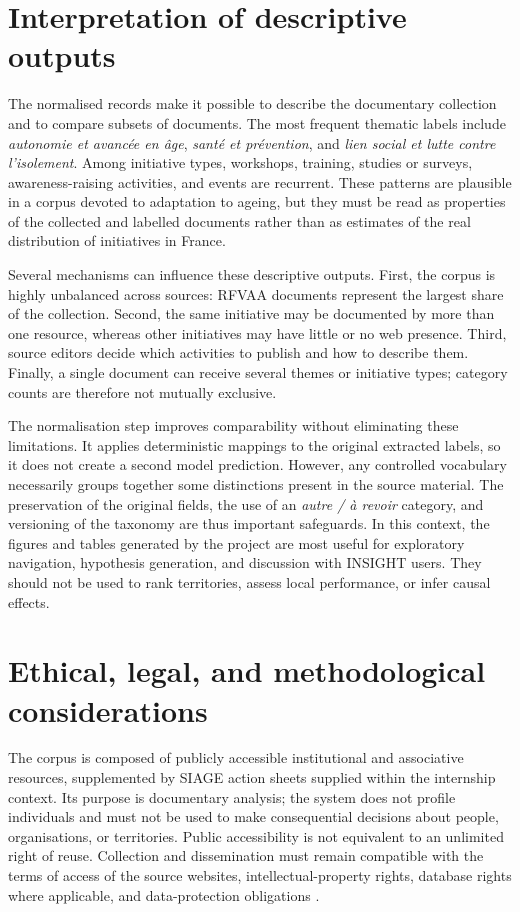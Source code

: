 \section{Interpretation of descriptive outputs}

The normalised records make it possible to describe the documentary collection
and to compare subsets of documents. The most frequent thematic labels include
\textit{autonomie et avanc\'ee en \^age}, \textit{sant\'e et pr\'evention}, and
\textit{lien social et lutte contre l'isolement}. Among initiative types,
workshops, training, studies or surveys, awareness-raising activities, and
events are recurrent. These patterns are plausible in a corpus devoted to
adaptation to ageing, but they must be read as properties of the collected and
labelled documents rather than as estimates of the real distribution of
initiatives in France.

Several mechanisms can influence these descriptive outputs. First, the corpus
is highly unbalanced across sources: RFVAA documents represent the largest
share of the collection. Second, the same initiative may be documented by more
than one resource, whereas other initiatives may have little or no web
presence. Third, source editors decide which activities to publish and how to
describe them. Finally, a single document can receive several themes or
initiative types; category counts are therefore not mutually exclusive.

The normalisation step improves comparability without eliminating these
limitations. It applies deterministic mappings to the original extracted
labels, so it does not create a second model prediction. However, any
controlled vocabulary necessarily groups together some distinctions present in
the source material. The preservation of the original fields, the use of an
\textit{autre / \`a revoir} category, and versioning of the taxonomy are thus
important safeguards. In this context, the figures and tables generated by the
project are most useful for exploratory navigation, hypothesis generation, and
discussion with INSIGHT users. They should not be used to rank territories,
assess local performance, or infer causal effects.

\section{Ethical, legal, and methodological considerations}

The corpus is composed of publicly accessible institutional and associative
resources, supplemented by SIAGE action sheets supplied within the internship
context. Its purpose is documentary analysis; the system does not profile
individuals and must not be used to make consequential decisions about people,
organisations, or territories. Public accessibility is not equivalent to an
unlimited right of reuse. Collection and dissemination must remain compatible
with the terms of access of the source websites, intellectual-property rights,
database rights where applicable, and data-protection obligations
\cite{cnil2024reuse}.

